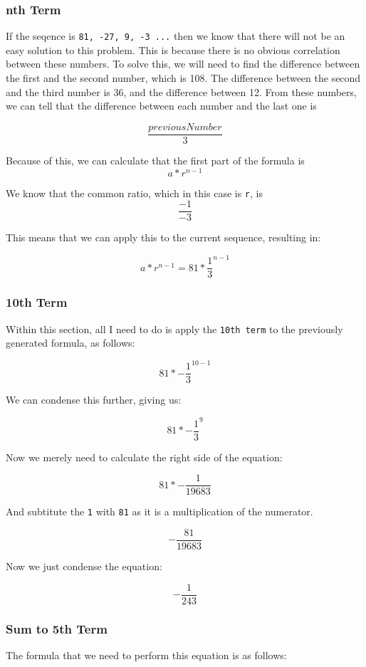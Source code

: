 \documentclass[a4paper,12pt]{article}
\begin{document}
\subsubsection{nth Term}
If the seqence is \texttt{81, -27, 9, -3 ...} then we know that there will not be an easy solution to this problem. This is because there is no obvious correlation between these numbers. To solve this, we will need to find the difference between the first and the second number, which is \textsc{108}. The difference between the second and the third number is \textsc{36}, and the difference between \textsc{12}. From these numbers, we can tell that the difference between each number and the last one is

\[
  \frac{previousNumber}{3}
\]

Because of this, we can calculate that the first part of the formula is
\[
  a * r^{n-1}
\]

We know that the common ratio, which in this case is \texttt{r}, is
\[
  \frac{-1}{-3}
\]

This means that we can apply this to the current sequence, resulting in:

\[
  a * r^{n-1} = 81 * \frac{1}{3}^{n-1}
\]

\newpage

\subsubsection{10th Term}
Within this section, all I need to do is apply the \texttt{10th term} to the previously generated formula, as follows:

\[
  81 * -\frac{1}{3}^{10-1}
\]

We can condense this further, giving us:

\[
  81 * -\frac{1}{3}^{9}
\]

Now we merely need to calculate the right side of the equation:

\[
  81 * -\frac{1}{19683}
\]

And subtitute the \texttt{1} with \texttt{81} as it is a multiplication of the numerator.

\[
  -\frac{81}{19683}
\]

Now we just condense the equation:

\[
  -\frac{1}{243}
\]

\subsubsection{Sum to 5th Term}
The formula that we need to perform this equation is as follows:
\end{document}
